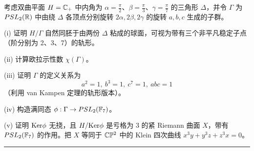 \begin{exercise} 考虑双曲平面 $H=\Bbb C_+$ 中内角为 $\alpha=\frac{\pi}{2}$、$\beta=\frac{\pi}{3}$、$\gamma=\frac{\pi}{7}$ 的三角形 $\Delta$，并令 $\Gamma$ 为 $PSL_2(\Bbb R)$ 中由绕 $\Delta$ 各顶点分别旋转 $2\alpha,2\beta,2\gamma$ 的旋转 $a,b,c$ 生成的子群。

(i) 证明 $H/\Gamma$ 自然同胚于由两份 $\Delta$ 粘成的球面，可视为带有三个非平凡稳定子点（阶分别为 2、3、7）的轨形。

(ii) 计算欧拉示性数 $\chi(\Gamma)$。

(iii) 证明 $\Gamma$ 的定义关系为
$$
a^2=1,\ b^3=1,\ c^7=1,\ abc=1
$$
（利用 van Kampen 定理的轨形版本）。

(iv) 构造满同态 $\phi: \Gamma\to PSL_2(\Bbb F_7)$。

(v) 证明 ${\rm Ker}\phi$ 无挠，且 $H/{\rm Ker}\phi$ 是亏格为 $3$ 的紧 Riemann 曲面 $X$，带有 $PSL_2(\Bbb F_7)$ 的作用。把 $X$ 等同于 $\Bbb C\Bbb P^2$ 中的 Klein 四次曲线 $x^3y+y^3z+z^3x=0$。
\end{exercise}

\bigskip
\noindent\rule{\textwidth}{0.6pt}

